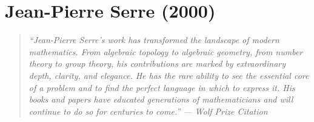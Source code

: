 \let\R\relax
\newcommand{\R}{\mathbb{R}}
\let\C\relax
\newcommand{\C}{\mathbb{C}}
\let\N\relax
\newcommand{\N}{\mathbb{N}}
\let\Z\relax
\newcommand{\Z}{\mathbb{Z}}
\let\Q\relax
\newcommand{\Q}{\mathbb{Q}}
\let\F\relax
\newcommand{\F}{\mathbb{F}}
\let\A\relax
\newcommand{\A}{\mathbb{A}}
\let\cO\relax
\newcommand{\cO}{\mathcal{O}}
\let\SO\relax
\newcommand{\SO}{\operatorname{SO}}
\let\SL\relax
\newcommand{\SL}{\operatorname{SL}}
\let\GL\relax
\newcommand{\GL}{\operatorname{GL}}
\let\St\relax
\newcommand{\St}{\operatorname{St}}
\let\GV\relax
\newcommand{\GV}{\operatorname{GV}}
\let\E\relax
\newcommand{\E}{\operatorname{E}}
\let\Gal\relax
\newcommand{\Gal}{\operatorname{Gal}}
\let\Frob\relax
\newcommand{\Frob}{\operatorname{Frob}}
\let\Spec\relax
\newcommand{\Spec}{\operatorname{Spec}}
\let\Proj\relax
\newcommand{\Proj}{\operatorname{Proj}}
\let\Hom\relax
\newcommand{\Hom}{\operatorname{Hom}}
\let\Ext\relax
\newcommand{\Ext}{\operatorname{Ext}}
\let\Tor\relax
\newcommand{\Tor}{\operatorname{Tor}}
\let\Aut\relax
\newcommand{\Aut}{\operatorname{Aut}}
\let\End\relax
\newcommand{\End}{\operatorname{End}}
\let\Pic\relax
\newcommand{\Pic}{\operatorname{Pic}}
\let\Sym\relax
\newcommand{\Sym}{\operatorname{Sym}}
\let\coker\relax
\newcommand{\coker}{\operatorname{coker}}
\let\Coh\relax
\newcommand{\Coh}{\operatorname{Coh}}
\let\An\relax
\newcommand{\An}{\operatorname{An}}
\let\Char\relax
\newcommand{\Char}{\operatorname{char}}
\let\ad\relax
\newcommand{\ad}{\operatorname{ad}}
\let\ch\relax
\newcommand{\ch}{\operatorname{ch}}
\let\Td\relax
\newcommand{\Td}{\operatorname{Td}}
\let\Norm\relax
\newcommand{\Norm}{\operatorname{Norm}}
\let\inv\relax
\newcommand{\inv}{\operatorname{inv}}

\chapter{Jean-Pierre Serre (2000)}

\begin{quote}
\it ``Jean-Pierre Serre's work has transformed the landscape of modern mathematics. From algebraic topology to algebraic geometry, from number theory to group theory, his contributions are marked by extraordinary depth, clarity, and elegance. He has the rare ability to see the essential core of a problem and to find the perfect language in which to express it. His books and papers have educated generations of mathematicians and will continue to do so for centuries to come.'' --- Wolf Prize Citation
\end{quote}

